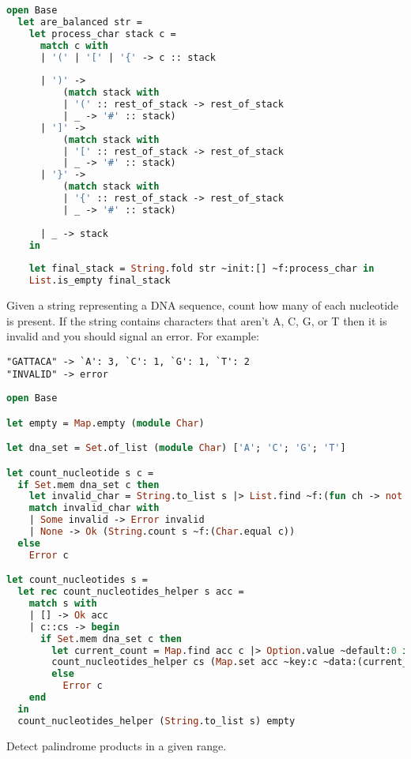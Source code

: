 \begin{lstlisting}[language=OCaml]
open Base
  let are_balanced str =
    let process_char stack c =
      match c with
      | '(' | '[' | '{' -> c :: stack
  
      | ')' ->
          (match stack with
          | '(' :: rest_of_stack -> rest_of_stack
          | _ -> '#' :: stack)
      | ']' ->
          (match stack with
          | '[' :: rest_of_stack -> rest_of_stack
          | _ -> '#' :: stack)
      | '}' ->
          (match stack with
          | '{' :: rest_of_stack -> rest_of_stack
          | _ -> '#' :: stack)
  
      | _ -> stack
    in
  
    let final_stack = String.fold str ~init:[] ~f:process_char in
    List.is_empty final_stack
\end{lstlisting}

Given a string representing a DNA sequence, count how many of each nucleotide is present.
If the string contains characters that aren't A, C, G, or T then it is invalid and you should signal an error.
For example:
\begin{verbatim}
"GATTACA" -> `A': 3, `C': 1, `G': 1, `T': 2
"INVALID" -> error
\end{verbatim}

\begin{lstlisting}[language=OCaml]
open Base

let empty = Map.empty (module Char)

let dna_set = Set.of_list (module Char) ['A'; 'C'; 'G'; 'T']

let count_nucleotide s c =
  if Set.mem dna_set c then
    let invalid_char = String.to_list s |> List.find ~f:(fun ch -> not (Set.mem dna_set ch)) in
    match invalid_char with
    | Some invalid -> Error invalid
    | None -> Ok (String.count s ~f:(Char.equal c))
  else
    Error c

let count_nucleotides s =
  let rec count_nucleotides_helper s acc =
    match s with
    | [] -> Ok acc
    | c::cs -> begin
      if Set.mem dna_set c then
        let current_count = Map.find acc c |> Option.value ~default:0 in
        count_nucleotides_helper cs (Map.set acc ~key:c ~data:(current_count + 1))
        else
          Error c
    end
  in
  count_nucleotides_helper (String.to_list s) empty
\end{lstlisting}

Detect palindrome products in a given range.

